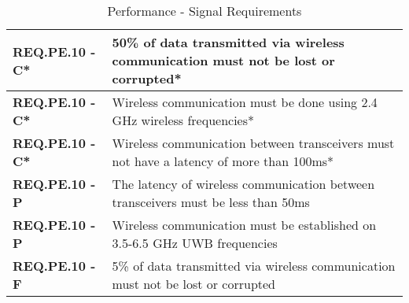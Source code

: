 \bgroup
\def\arraystretch{1.5}
\begin{table}[H]
\centering
\begin{tabular}{ | m{3.5cm} | m{12.5cm} |} 
\hline
 \textbf{REQ.PE.10 - C*} & 50\% of data transmitted via wireless communication must not be lost or corrupted* \\
\hline
 \textbf{REQ.PE.10 - C*} & Wireless communication must be done using 2.4 GHz wireless frequencies* \\
\hline
 \textbf{REQ.PE.10 - C*} & Wireless communication between transceivers must not have a latency of more than 100ms* \\
\hline
 \textbf{REQ.PE.10 - P} & The latency of wireless communication between transceivers must be less than 50ms \\
\hline
 \textbf{REQ.PE.10 - P} & Wireless communication must be established on 3.5-6.5 GHz UWB frequencies \\
\hline
 \textbf{REQ.PE.10 - F} & 5\% of data transmitted via wireless communication must not be lost or corrupted \\

\hline
\end{tabular}
\caption{Performance - Signal Requirements }
\end{table}	
	
%